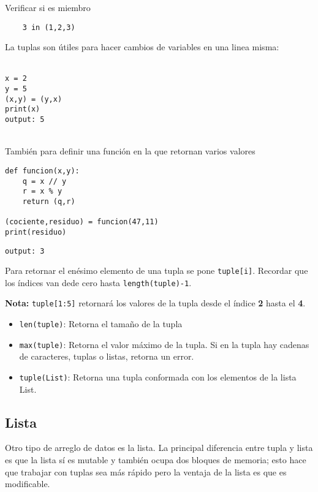 Verificar si es miembro

\begin{verbatim}
    3 in (1,2,3)
\end{verbatim}

La tuplas son útiles para hacer cambios de variables en una linea misma: \\\

\texttt{x = 2}\\
\texttt{y = 5}\\
\texttt{(x,y) = (y,x)}\\
\texttt{print(x)}\\
\texttt{output: 5}\\\

También para definir una función en la que retornan varios valores

\begin{verbatim}
def funcion(x,y):
    q = x // y
    r = x % y
    return (q,r)
    
(cociente,residuo) = funcion(47,11)
print(residuo)
\end{verbatim}
\begin{lstlisting}
output: 3
\end{lstlisting}

Para retornar el enésimo elemento de una tupla se pone \texttt{tuple[i]}.
Recordar que los índices van dede cero hasta \texttt{length(tuple)-1}.

\textbf{Nota:} \texttt{tuple[1:5]} retornará los valores de la tupla desde el
índice \textbf{2} hasta el \textbf{4}.

\begin{itemize}
    \item \texttt{len(tuple)}: Retorna el tamaño de la tupla
    \item \texttt{max(tuple)}: Retorna el valor máximo de la tupla. Si en la
          tupla hay cadenas de caracteres, tuplas o listas, retorna un error.
    \item \texttt{tuple(List)}: Retorna una tupla conformada con los elementos
          de la lista List.
\end{itemize}

\subsection{Lista}

Otro tipo de arreglo de datos es la lista. La principal diferencia entre tupla
y lista es que la lista sí es mutable y también ocupa dos bloques de memoria;
esto hace que trabajar con tuplas sea más rápido pero la ventaja de la lista es
que es modificable.


